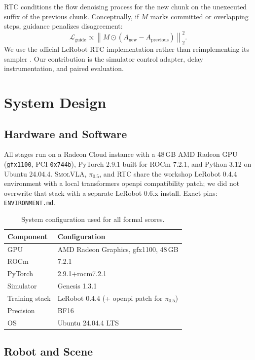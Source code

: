 \documentclass[10pt,twocolumn]{article}
\newcommand{\pifive}{$\pi_{0.5}$}
\newcommand{\smolvla}{\textsc{SmolVLA}}
\begin{document}
RTC conditions the flow denoising process for the new chunk on the unexecuted
suffix of the previous chunk.  Conceptually, if $M$ marks committed or
overlapping steps, guidance penalizes disagreement:
\begin{equation}
  \mathcal{L}_{\mathrm{guide}}
  \propto \left\|M \odot
  \left(A_{\mathrm{new}}-A_{\mathrm{previous}}\right)\right\|_2^2.
\end{equation}
We use the official LeRobot RTC implementation rather than reimplementing its
sampler \cite{lerobot2026rtcdocs}.  Our contribution is the simulator control
adapter, delay instrumentation, and paired evaluation.

\section{System Design}

\subsection{Hardware and Software}

All stages run on a Radeon Cloud instance with a 48\,GB AMD Radeon GPU
(\texttt{gfx1100}, PCI \texttt{0x744b}), PyTorch 2.9.1 built for ROCm 7.2.1,
and Python 3.12 on Ubuntu 24.04.4.  \smolvla, \pifive, and RTC share the
workshop LeRobot 0.4.4 environment with a local transformers openpi
compatibility patch; we did not overwrite that stack with a separate
LeRobot 0.6.x install. Exact pins: \texttt{ENVIRONMENT.md}.

\begin{table}[t]
\centering
\caption{System configuration used for all formal scores.}
\label{tab:system}
\small
\begin{tabular}{ll}
\toprule
Component & Configuration \\
\midrule
GPU & AMD Radeon Graphics, gfx1100, 48\,GB \\
ROCm & 7.2.1 \\
PyTorch & 2.9.1+rocm7.2.1 \\
Simulator & Genesis 1.3.1 \\
Training stack & LeRobot 0.4.4 (+ openpi patch for $\pi_{0.5}$) \\
Precision & BF16 \\
OS & Ubuntu 24.04.4 LTS \\
\bottomrule
\end{tabular}
\end{table}

\subsection{Robot and Scene}
\end{document}
